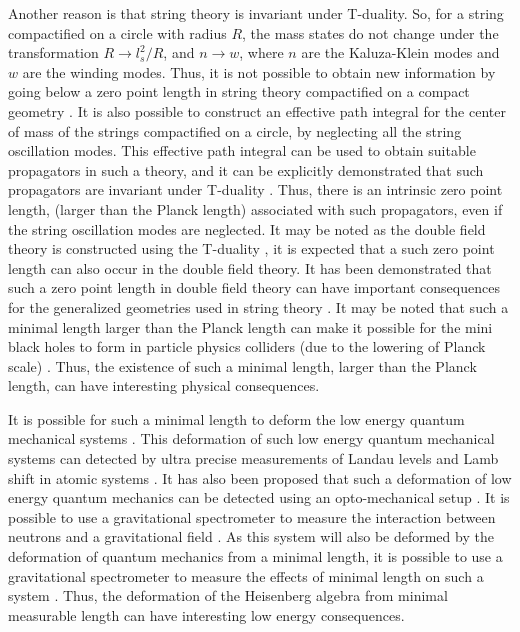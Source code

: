 \documentclass[12pt]{article}
\begin{document}
Another reason is that string theory is invariant under T-duality. So, for a string compactified on a circle with radius $R$, the mass states do not change  under the transformation  $R\to l_s^2/R$, and $n\to w$, where $n$ are the Kaluza-Klein modes and $w$ are the winding modes. Thus, it is not possible to obtain new information by going below a zero point length in  string theory compactified on a compact geometry \cite{s16}. It is also possible to construct an effective path integral for the center of mass of the strings compactified on a circle,  by neglecting all the string  oscillation modes. This effective path integral can be used to obtain suitable propagators  in such a theory, and it can be explicitly demonstrated that such propagators are invariant under T-duality \cite{green1, green2}.
Thus, there is an intrinsic zero point  length,  (larger than the Planck length) associated  with such propagators, even if the string oscillation modes are neglected. It may be noted as the double field theory is constructed using the T-duality \cite{df12, df14}, it is expected that a such zero point length can  also occur  in the double field theory. It has been demonstrated that such a zero point length  in double field theory can have important consequences for the generalized geometries used in string theory \cite{mi15}. It may be noted that such a minimal length larger than the Planck length can make it possible for the mini  black holes to form in particle physics colliders (due to the lowering of Planck scale) \cite{co12, co14}.  Thus, the existence of such a minimal length, larger than the Planck length, can have interesting physical consequences. 

It is possible for such a minimal length to deform the low energy quantum mechanical systems  \cite{ml12, ml21}. This deformation of such low energy quantum mechanical systems can detected by ultra precise measurements of Landau levels and Lamb shift in atomic systems \cite{ml15}. It has also been proposed that such a deformation of low energy quantum mechanics can be detected using an opto-mechanical setup \cite{ml14}.  It is possible to use a  gravitational spectrometer  to measure the interaction between neutrons and a gravitational field 
\cite{ne12ab, ne14ab}. As this system will also be deformed by the deformation of quantum mechanics from a minimal length, it is possible to use  a gravitational spectrometer to measure the effects of minimal length on such a system  \cite{ml16}.   Thus, the deformation of the  Heisenberg algebra from minimal measurable length can have interesting low energy consequences. 
\end{document}
